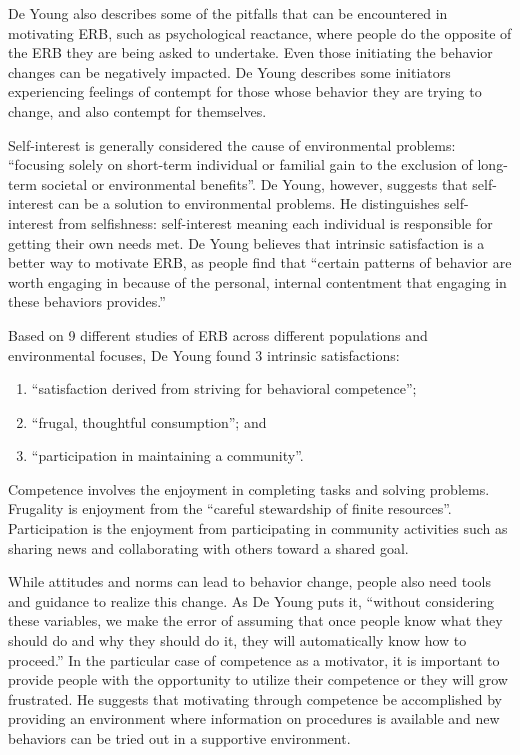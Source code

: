 De Young also describes some of the pitfalls that can be encountered in motivating ERB, such as psychological reactance, where people do the opposite of the ERB they are being asked to undertake. Even those initiating the behavior changes can be negatively impacted. De Young describes some initiators experiencing feelings of contempt for those whose behavior they are trying to change, and also contempt for themselves.

Self-interest is generally considered the cause of environmental problems: ``focusing solely on short-term individual or familial gain to the exclusion of long-term societal or environmental benefits''. De Young, however, suggests that self-interest can be a solution to environmental problems. He distinguishes self-interest from selfishness: self-interest meaning each individual is responsible for getting their own needs met. De Young believes that intrinsic satisfaction is a better way to motivate ERB, as people find that ``certain patterns of behavior are worth engaging in because of the personal, internal contentment that engaging in these behaviors provides.''

Based on 9 different studies of ERB across different populations and environmental focuses, De Young found 3 intrinsic satisfactions:
\begin{enumerate}
	\item ``satisfaction derived from striving for behavioral competence'';
	\item ``frugal, thoughtful consumption''; and
	\item ``participation in maintaining a community''.
\end{enumerate}

Competence involves the enjoyment in completing tasks and solving problems. Frugality is enjoyment from the ``careful stewardship of finite resources''. Participation is the enjoyment from participating in community activities such as sharing news and collaborating with others toward a shared goal.

While attitudes and norms can lead to behavior change, people also need tools and guidance to realize this change. As De Young puts it, ``without considering these variables, we make the error of assuming that once people know what they should do and why they should do it, they will automatically know how to proceed.'' In the particular case of competence as a motivator, it is important to provide people with the opportunity to utilize their competence or they will grow frustrated. He suggests that motivating through competence be accomplished by providing an environment where information on procedures is available and new behaviors can be tried out in a supportive environment.

